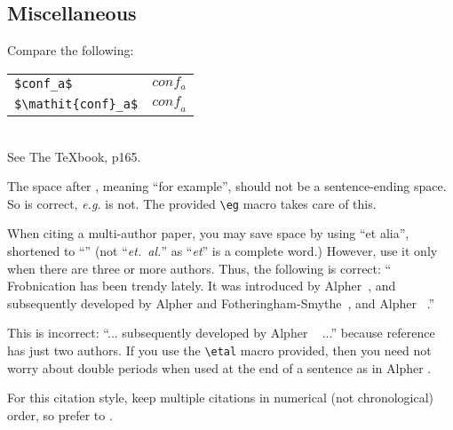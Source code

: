 
\subsection{Miscellaneous}

\noindent
Compare the following:\\
\begin{tabular}{ll}
	\verb'$conf_a$' &  $conf_a$ \\
	\verb'$\mathit{conf}_a$' & $\mathit{conf}_a$
\end{tabular}\\
See The \TeX book, p165.

The space after \eg, meaning ``for example'', should not be a
sentence-ending space. So \eg is correct, {\em e.g.} is not.  The provided
\verb'\eg' macro takes care of this.

When citing a multi-author paper, you may save space by using ``et alia'',
shortened to ``\etal'' (not ``{\em et.\ al.}'' as ``{\em et}'' is a complete word.)
However, use it only when there are three or more authors.  Thus, the
following is correct: ``
Frobnication has been trendy lately.
It was introduced by Alpher~\cite{Alpher02}, and subsequently developed by
Alpher and Fotheringham-Smythe~\cite{Alpher03}, and Alpher \etal~\cite{Alpher04}.''

This is incorrect: ``... subsequently developed by Alpher \etal~\cite{Alpher03} ...''
because reference~\cite{Alpher03} has just two authors.  If you use the
\verb'\etal' macro provided, then you need not worry about double periods
when used at the end of a sentence as in Alpher \etal.

For this citation style, keep multiple citations in numerical (not
chronological) order, so prefer \cite{Alpher03,Alpher02,Authors14} to
\cite{Alpher02,Alpher03,Authors14}.
